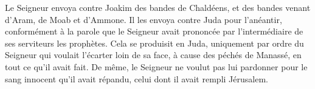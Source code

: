 Le Seigneur envoya contre Joakim des bandes de Chaldéens,
	et des bandes venant d’Aram, de Moab et d’Ammone.
Il les envoya contre Juda pour l’anéantir,
	conformément à la parole que le Seigneur avait prononcée
	par l’intermédiaire de ses serviteurs les prophètes.
Cela se produisit en Juda,
	uniquement par ordre du Seigneur qui voulait l’écarter loin de sa face,
	à cause des péchés de Manassé, en tout ce qu’il avait fait.
De même, le Seigneur ne voulut pas lui pardonner
		pour le sang innocent qu’il avait répandu,
	celui dont il avait rempli Jérusalem.
